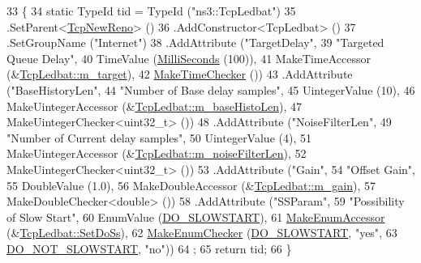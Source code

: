 \begin{DoxyCode}
33 \{
34   \textcolor{keyword}{static} TypeId tid = TypeId (\textcolor{stringliteral}{"ns3::TcpLedbat"})
35     .SetParent<\hyperlink{classns3_1_1TcpNewReno_a81686cb1590be6d7c754029fc8d7cf4e}{TcpNewReno}> ()
36     .AddConstructor<TcpLedbat> ()
37     .SetGroupName (\textcolor{stringliteral}{"Internet"})
38     .AddAttribute (\textcolor{stringliteral}{"TargetDelay"},
39                    \textcolor{stringliteral}{"Targeted Queue Delay"},
40                    TimeValue (\hyperlink{group__timecivil_gaf26127cf4571146b83a92ee18679c7a9}{MilliSeconds} (100)),
41                    MakeTimeAccessor (&\hyperlink{classns3_1_1TcpLedbat_a93ab2886c4bbbcec5a6efd192c437fb7}{TcpLedbat::m\_target}),
42                    \hyperlink{group__time_ga7032965bd4afa578691d88c09e4481c1}{MakeTimeChecker} ())
43     .AddAttribute (\textcolor{stringliteral}{"BaseHistoryLen"},
44                    \textcolor{stringliteral}{"Number of Base delay samples"},
45                    UintegerValue (10),
46                    MakeUintegerAccessor (&\hyperlink{classns3_1_1TcpLedbat_ab72482ecda86d4f7f54c75dfeaa39eb2}{TcpLedbat::m\_baseHistoLen}),
47                    MakeUintegerChecker<uint32\_t> ())
48     .AddAttribute (\textcolor{stringliteral}{"NoiseFilterLen"},
49                    \textcolor{stringliteral}{"Number of Current delay samples"},
50                    UintegerValue (4),
51                    MakeUintegerAccessor (&\hyperlink{classns3_1_1TcpLedbat_abbc074450211a63831a0bf5313252310}{TcpLedbat::m\_noiseFilterLen}),
52                    MakeUintegerChecker<uint32\_t> ())
53     .AddAttribute (\textcolor{stringliteral}{"Gain"},
54                    \textcolor{stringliteral}{"Offset Gain"},
55                    DoubleValue (1.0),
56                    MakeDoubleAccessor (&\hyperlink{classns3_1_1TcpLedbat_a41255ef3e04f7cc54c4634c3729da506}{TcpLedbat::m\_gain}),
57                    MakeDoubleChecker<double> ())
58     .AddAttribute (\textcolor{stringliteral}{"SSParam"},
59                    \textcolor{stringliteral}{"Possibility of Slow Start"},
60                    EnumValue (\hyperlink{classns3_1_1TcpLedbat_a7099bb59b406b311fab27960df7c8620aff8b53c555fefc60284c7bd4301c002f}{DO\_SLOWSTART}),
61                    \hyperlink{namespacens3_af5050739867ce63896dec011e332c8ec}{MakeEnumAccessor} (&\hyperlink{classns3_1_1TcpLedbat_a3d0596a0f90e3b199451a36f310ef71d}{TcpLedbat::SetDoSs}),
62                    \hyperlink{namespacens3_a48832781a2b521d3d0091e05ece30615}{MakeEnumChecker} (\hyperlink{classns3_1_1TcpLedbat_a7099bb59b406b311fab27960df7c8620aff8b53c555fefc60284c7bd4301c002f}{DO\_SLOWSTART}, \textcolor{stringliteral}{"yes"},
63                                     \hyperlink{classns3_1_1TcpLedbat_a7099bb59b406b311fab27960df7c8620ac4ed97ba794665876b847c01dd9c84e9}{DO\_NOT\_SLOWSTART}, \textcolor{stringliteral}{"no"}))
64   ;
65   \textcolor{keywordflow}{return} tid;
66 \}
\end{DoxyCode}


